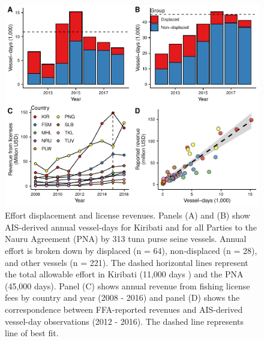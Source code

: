 \documentclass[12pt]{article}
\begin{document}
\begin{figure}[htbp]
\centering
\includegraphics{img/empirical.pdf}
\caption{\label{fig:empirical}Effort displacement and license revenues. Panels (A) and (B) show AIS-derived annual vessel-days for Kiribati and for all Parties to the Nauru Agreement (PNA) by 313 tuna purse seine vessels. Annual effort is broken down by displaced (n = 64), non-displaced (n = 28), and other vessels (n = 221). The dashed horizontal lines represent the total allowable effort in Kiribati (11,000 days \cite{yeeting2018stabilising}) and the PNA (45,000 days). Panel (C) shows annual revenue from fishing license fees by country and year (2008 - 2016) and panel (D) shows the correspondence between FFA-reported revenues and AIS-derived vessel-day observations (2012 - 2016). The dashed line represents line of best fit.}
\end{figure}
\end{document}
